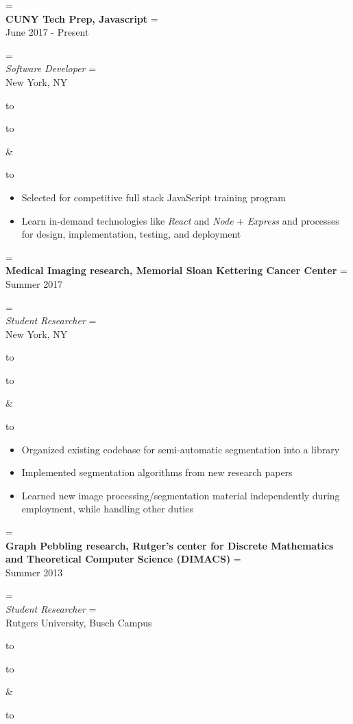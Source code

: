 \documentclass{article}
\newcommand{\appendtotoks}[2]{%
  #1=\expandafter{\the#1#2}%
}
\def\gobble#1{}
\def\gobblefirst#1{%
  #1\expandafter\expandafter\expandafter{\expandafter\gobble\the#1}}
\newcommand{\sectionTitle}[1]{{\Large #1} \vspace{4pt}}
\newenvironment{resumesection}[1]
  {\sectionTitle{#1}}
	{\vspace{10pt}}
\newcommand{\placeStyle}[1]{\textbf{#1}}
\newcommand{\positionStyle}[1]{\textit{#1}}
\newenvironment{newplace}
  {
    \newtoks\leftToks
    \newtoks\rightToks
    \newcommand{\placerow}[2]{%
      \appendtotoks{\leftToks}{\\\placeStyle{##1}}%
      \appendtotoks{\rightToks}{\\##2}}
    \newcommand{\jobrow}[2]{%
      \appendtotoks{\leftToks}{\\\positionStyle{##1}}%
      \appendtotoks{\rightToks}{\\##2}}
    \newcommand{\plainrow}[2]{%
      \appendtotoks{\leftToks}{\\##1}%
      \appendtotoks{\rightToks}{\\##2}}
    \setlength{\tabcolsep}{0pt}%
  }
  {%
    \begin{tabu} to \linewidth [h!]{X[65,l]X[35,r]}
      \begin{tabu} to \linewidth {X}
        \gobblefirst\leftToks
        \the\leftToks
      \end{tabu}
      &
      \begin{tabu} to \linewidth {X[r]}
        \gobblefirst\rightToks
        \the\rightToks
      \end{tabu}
    \end{tabu}%
  }
\newenvironment{bullets}
	{\begin{itemize}[noitemsep, topsep=0pt]}
	{\end{itemize}}
\begin{document}
\begin{resumesection}{Experience}


\begin{newplace}
	\placerow{CUNY Tech Prep, Javascript}
				   {June 2017 - Present}
	\jobrow  {Software Developer}
					 {New York, NY}
\end{newplace}

\begin{bullets}
  \item Selected for competitive full stack JavaScript training
        program
  \item Learn in-demand technologies like \textit{React} and
        \textit{Node} + \textit{Express} and processes for design,
        implementation, testing, and deployment
\end{bullets}


\begin{newplace}
  \placerow{Medical Imaging research, Memorial Sloan Kettering Cancer
            Center}
				   {Summer 2017}
  \jobrow  {Student Researcher}
				   {New York, NY}
\end{newplace}

\begin{bullets}
  \item Organized existing codebase for semi-automatic segmentation
        into a library
  \item Implemented segmentation algorithms from new research papers
  \item Learned new image processing/segmentation material
        independently during employment, while handling other duties
\end{bullets}


\begin{newplace}
	\placerow{Graph Pebbling research, Rutger's center for Discrete
            Mathematics and Theoretical Computer Science (DIMACS)}
				   {Summer 2013}
	\jobrow  {Student Researcher}
				   {Rutgers University, Busch Campus}
\end{newplace}


\end{resumesection}
\end{document}
